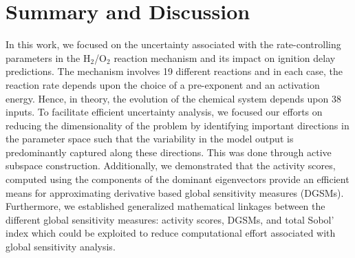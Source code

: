 \section{Summary and Discussion}
\label{sec:conc}

%
 
In this work, we focused on the uncertainty associated with the
rate-controlling parameters in the H$_2$/O$_2$ reaction mechanism and its
impact on ignition delay predictions. The mechanism involves 19 different
reactions and in each case, the reaction rate depends upon the choice of a
pre-exponent and an activation energy. Hence, in theory, the evolution of the
chemical system depends upon 38 inputs. 
To facilitate efficient uncertainty analysis, we focused our efforts on
reducing the dimensionality of the problem by identifying important directions
in the parameter space such that the variability in the model output is
predominantly captured along these directions. This was done through active
subspace construction.  Additionally, we demonstrated that the activity scores,
computed using the components of the dominant eigenvectors provide an efficient
means for approximating derivative based global sensitivity measures (DGSMs).
Furthermore, we established generalized mathematical linkages between the
different global sensitivity measures: activity scores, DGSMs, and total Sobol'
index which could be exploited to reduce computational effort associated with
global sensitivity analysis. 
 

